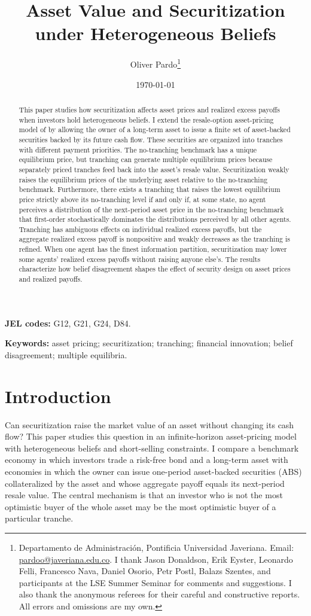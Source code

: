 \documentclass[11pt]{article}
\title{Asset Value and Securitization under Heterogeneous Beliefs}
\author{Oliver Pardo\thanks{Departamento de Administración, Pontificia Universidad Javeriana. Email: \href{mailto:pardoo@javeriana.edu.co}{pardoo@javeriana.edu.co}. I thank Jason Donaldson, Erik Eyster, Leonardo Felli, Francesco Nava, Daniel Osorio, Petr Postl, Balazs Szentes, and participants at the LSE Summer Seminar for comments and suggestions. I also thank the anonymous referees for their careful and constructive reports. All errors and omissions are my own.}}
\date{\today}
\theoremstyle{plain}
\begin{document}
\maketitle

\begin{abstract}
This paper studies how securitization affects asset prices and realized excess payoffs when investors hold heterogeneous beliefs. I extend the resale-option asset-pricing model of \cite{HarrisonKreps1978} by allowing the owner of a long-term asset to issue a finite set of asset-backed securities backed by its future cash flow. These securities are organized into tranches with different payment priorities. The no-tranching benchmark has a unique equilibrium price, but tranching can generate multiple equilibrium prices because separately priced tranches feed back into the asset's resale value. Securitization weakly raises the equilibrium prices of the underlying asset relative to the no-tranching benchmark. Furthermore, there exists a tranching that raises the lowest equilibrium price strictly above its no-tranching level if and only if, at some state, no agent perceives a distribution of the next-period asset price in the no-tranching benchmark that first-order stochastically dominates the distributions perceived by all other agents. Tranching has ambiguous effects on individual realized excess payoffs, but the aggregate realized excess payoff is nonpositive and weakly decreases as the tranching is refined. When one agent has the finest information partition, securitization may lower some agents' realized excess payoffs without raising anyone else's. The results characterize how belief disagreement shapes the effect of security design on asset prices and realized payoffs.

\end{abstract}

\noindent\textbf{JEL codes:} G12, G21, G24, D84.

\noindent\textbf{Keywords:} asset pricing; securitization; tranching; financial innovation; belief disagreement; multiple equilibria.

\section{Introduction}

Can securitization raise the market value of an asset without changing its cash flow? This paper studies this question in an infinite-horizon asset-pricing model with heterogeneous beliefs and short-selling constraints. I compare a benchmark economy in which investors trade a risk-free bond and a long-term asset with economies in which the owner can issue one-period asset-backed securities (ABS) collateralized by the asset and whose aggregate payoff equals its next-period resale value. The central mechanism is that an investor who is not the most optimistic buyer of the whole asset may be the most optimistic buyer of a particular tranche.
\end{document}

